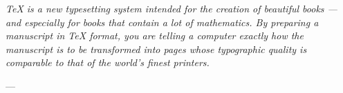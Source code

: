 \begin{epigrafe}
    \vspace*{\fill}
    \begin{flushright}
        \textit{\TeX{} is a new typesetting system intended for the creation of beautiful books --- and especially for books that contain a lot of mathematics. By preparing a manuscript in \TeX{} format, you are telling a computer exactly how the manuscript is to be transformed into pages whose typographic quality is comparable to that of the world's finest printers.}

        --- \textcite{Knuth1984}
    \end{flushright}
\end{epigrafe}
